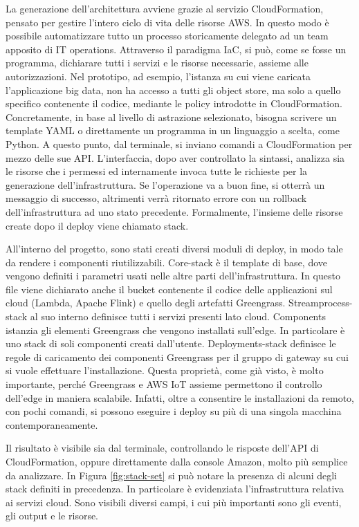 La generazione dell'architettura avviene grazie al servizio CloudFormation, pensato per gestire l'intero ciclo di vita delle risorse AWS. In questo modo è possibile automatizzare tutto un processo storicamente delegato ad un team apposito di IT operations. Attraverso il paradigma IaC, si può, come se fosse un programma, dichiarare tutti i servizi e le risorse necessarie, assieme alle autorizzazioni. Nel prototipo, ad esempio, l'istanza su cui viene caricata l'applicazione big data, non ha accesso a tutti gli object store, ma solo a quello specifico contenente il codice, mediante le policy introdotte in CloudFormation. Concretamente, in base al livello di astrazione selezionato, bisogna scrivere un template YAML o direttamente un programma in un linguaggio a scelta, come Python. A questo punto, dal terminale, si inviano comandi a CloudFormation per mezzo delle sue API. L'interfaccia, dopo aver controllato la sintassi, analizza sia le risorse che i permessi ed internamente invoca tutte le richieste per la generazione dell'infrastruttura. Se l'operazione va a buon fine, si otterrà un messaggio di successo, altrimenti verrà ritornato errore con un rollback dell'infrastruttura ad uno stato precedente. Formalmente, l'insieme delle risorse create dopo il deploy viene chiamato stack. 

\newpage
All'interno del progetto, sono stati creati diversi moduli di deploy, in modo tale da rendere i componenti riutilizzabili. Core-stack è il template di base, dove vengono definiti i parametri usati nelle altre parti dell'infrastruttura. In questo file viene dichiarato anche il bucket contenente il codice delle applicazioni sul cloud (Lambda, Apache Flink) e quello degli artefatti Greengrass. Streamprocess-stack al suo interno definisce tutti i servizi presenti lato cloud. Components istanzia gli elementi Greengrass che vengono installati sull'edge. In particolare è uno stack di soli componenti creati dall’utente. Deployments-stack definisce le regole di caricamento dei componenti Greengrass per il gruppo di gateway su cui si vuole effettuare l'installazione. Questa proprietà, come già visto, è molto importante, perché Greengrass e AWS IoT assieme permettono il controllo dell'edge in maniera scalabile. Infatti, oltre a consentire le installazioni da remoto, con pochi comandi, si possono eseguire i deploy su più di una singola macchina contemporaneamente. 

Il risultato è visibile sia dal terminale, controllando le risposte dell'API di CloudFormation, oppure direttamente dalla console Amazon, molto più semplice da analizzare. In Figura \ref{fig:stack-set} si può notare la presenza di alcuni degli stack definiti in precedenza. In particolare è evidenziata l'infrastruttura relativa ai servizi cloud. Sono visibili diversi campi, i cui più importanti sono gli eventi, gli output e le risorse. 

